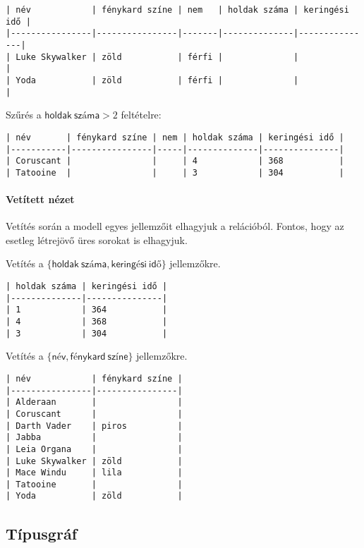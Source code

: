 \begin{verbatim}
| név            | fénykard színe | nem   | holdak száma | keringési idő |
|----------------|----------------|-------|--------------|---------------|
| Luke Skywalker | zöld           | férfi |              |               |
| Yoda           | zöld           | férfi |              |               |
\end{verbatim}

Szűrés a $\mathsf{holdak\: száma} > 2$ feltételre:

\begin{verbatim}
| név       | fénykard színe | nem | holdak száma | keringési idő |
|-----------|----------------|-----|--------------|---------------|
| Coruscant |                |     | 4            | 368           |
| Tatooine  |                |     | 3            | 304           |
\end{verbatim}

\paragraph{Vetített nézet}

Vetítés során a modell egyes jellemzőit elhagyjuk a relációból. Fontos, hogy az esetleg létrejövő üres sorokat is elhagyjuk.

Vetítés a $\{\mathsf{holdak\: száma, keringési\: idő\}}$ jellemzőkre.

\begin{verbatim}
| holdak száma | keringési idő |
|--------------|---------------|
| 1            | 364           |
| 4            | 368           |
| 3            | 304           |
\end{verbatim}

Vetítés a $\{\mathsf{név, fénykard\: színe\}}$ jellemzőkre.

\begin{verbatim}
| név            | fénykard színe |
|----------------|----------------|
| Alderaan       |                |
| Coruscant      |                |
| Darth Vader    | piros          |
| Jabba          |                |
| Leia Organa    |                |
| Luke Skywalker | zöld           |
| Mace Windu     | lila           |
| Tatooine       |                |
| Yoda           | zöld           |
\end{verbatim}

\subsection{Típusgráf}

